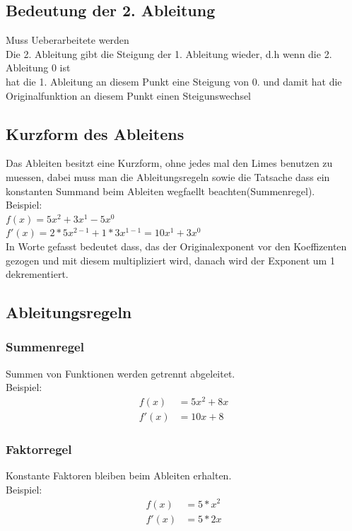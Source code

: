 \documentclass[a4paper]{article} %
\begin{document}
	\subsection{Bedeutung der 2. Ableitung}
	Muss Ueberarbeitete werden\\
	Die 2. Ableitung gibt die Steigung der 1. Ableitung wieder, d.h wenn die 2. Ableitung 0 ist \\hat die 1. Ableitung an diesem Punkt eine 
	Steigung von 0. und damit hat die Originalfunktion an diesem Punkt einen Steigunswechsel
	\subsection{Kurzform des Ableitens}
	
	Das Ableiten besitzt eine Kurzform, ohne jedes mal den Limes benutzen zu muessen, dabei muss man die Ableitungsregeln sowie die Tatsache dass ein konstanten Summand beim Ableiten wegfaellt beachten(Summenregel).
\\	Beispiel:\\
	$f(x)  =5x^2+3x^1-5x^0$\\
	$f'(x)  =2*5x^{2-1}+1*3x^{1-1} = 10x^1+3x^0$\\
	In Worte gefasst bedeutet dass, das der Originalexponent vor den Koeffizenten gezogen und mit diesem multipliziert wird, danach wird der Exponent um 1 dekrementiert.
	\subsection{Ableitungsregeln}
	\subsubsection{Summenregel}
	Summen von Funktionen werden getrennt abgeleitet. \\
	Beispiel: \\ 
		\begin{align*}
			f(x) &= 5x^2+8x  \\
			 f'(x)&= 10x+8
		\end{align*}
	\subsubsection{Faktorregel}
	Konstante Faktoren bleiben beim Ableiten erhalten. \\
	Beispiel: \\ \begin{align*}
					f(x)&= 5*x^2 \\ 
					f'(x) &= 5*2x
				\end{align*}
	
\end{document}
